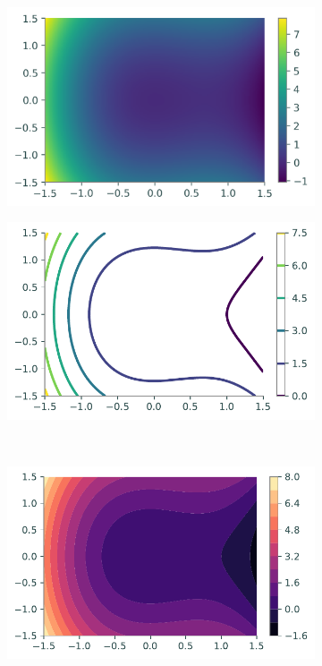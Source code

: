 \begin{figure}[H] %
    \centering
    \begin{subfigure}{.495\textwidth}
        \centering
        \includegraphics[width=\textwidth]{figures/heatmap_1.png}
    \end{subfigure}
    \begin{subfigure}{.495\textwidth}
        \centering
        \includegraphics[width=\textwidth]{figures/contour_1.pdf}
    \end{subfigure}
    \\
    \begin{subfigure}{.495\textwidth}
        \centering
        \includegraphics[width=\textwidth]{figures/contour_2.pdf}

\end{subfigure}
\end{figure}
